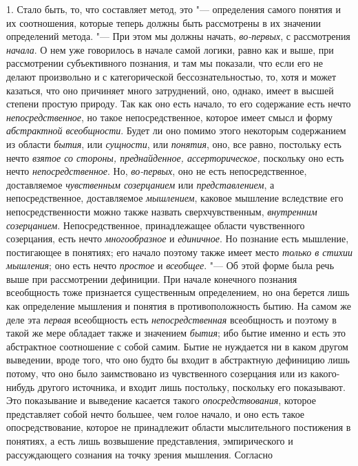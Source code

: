 1. Стало быть, то, что составляет метод, это
"--- определения самого понятия и их соотношения, которые теперь
должны быть рассмотрены в их значении определений метода. "---
При этом мы должны начать, {\em во-первых}, с рассмотрения {\em начала}.
О нем уже говорилось в начале самой логики, равно как и выше,
при рассмотрении субъективного познания, и там мы показали, что если его не
делают произвольно и с категорической бессознательностью, то, хотя и может
казаться, что оно причиняет много затруднений, оно, однако,
имеет в высшей степени простую природу. Так как оно есть начало, то его
содержание есть нечто {\em непосредственное},
но такое непосредственное, которое имеет смысл и форму
{\em абстрактной всеобщности}.
Будет ли оно помимо этого некоторым содержанием из области
{\em бытия}, или {\em сущности}, или {\em понятия}, оно, все
равно, постольку есть нечто {\em взятое
со стороны, преднайденное, ассерторическое,} поскольку оно
есть нечто {\em непосредственное}. Но, {\em во-первых},
оно не есть непосредственное, доставляемое
{\em чувственным созерцанием} или {\em представлением},
а непосредственное, доставляемое {\em мышлением}, каковое
мышление вследствие его непосредственности можно также назвать
сверхчувственным, {\em внутренним
созерцанием}. Непосредственное, принадлежащее области
чувственного созерцания, есть нечто
{\em многообразное} и {\em единичное}. Но
познание есть мышление, постигающее в понятиях; его начало поэтому также
имеет место {\em только в стихии
мышления}; оно есть нечто {\em простое} и {\em всеобщее}. "--- Об этой
форме была речь выше при рассмотрении дефиниции. При начале конечного
познания всеобщность тоже признается существенным определением, но она
берется лишь как определение мышления и понятия в противоположность бытию.
На самом же деле эта {\em первая} всеобщность есть {\em непосредственная}
всеобщность и поэтому в такой же мере обладает также и значением {\em бытия};
ибо бытие именно и есть это абстрактное соотношение с собой
самим. Бытие не нуждается ни в каком другом выведении, вроде того, что оно
будто бы входит в абстрактную дефиницию лишь потому, что оно было
заимствовано из чувственного созерцания или из какого-нибудь другого
источника, и входит лишь постольку, поскольку его показывают. Это
показывание и выведение касается такого {\em опосредствования},
которое представляет собой нечто большее, чем голое начало, и
оно есть такое опосредствование, которое не принадлежит области
мыслительного постижения в понятиях, а есть лишь возвышение представления,
эмпирического и рассуждающего сознания на точку зрения мышления. Согласно
